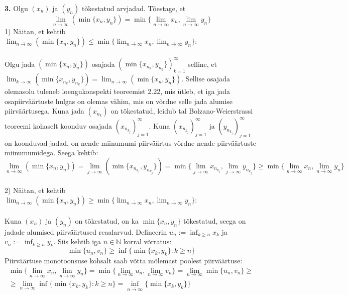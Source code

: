 \documentclass{article}
\begin{document}
\textbf{3.} Olgu $(x_n)$ ja $(y_n)$ t\~okestatud arvjadad. T\~oestage, et
\begin{equation*}
\lim_{\overline{n\to\infty}}(\min \{x_n,y_n\})=\min\{\lim_{\overline{n\to\infty}} x_n, \lim_{\overline{n\to\infty}} y_n \}
\end{equation*}
1) N\"aitan, et kehtib $\displaystyle \lim_{\overline{n\to\infty}}(\min \{x_n,y_n\})\leq\min\{\lim_{\overline{n\to\infty}} x_n, \lim_{\overline{n\to\infty}} y_n \}$:\\\\
Olgu jada $(\min\{x_n,y_n\})$ osajada $(\min\{x_{n_k},y_{n_k}\})_{k=1}^\infty$ selline, et $\displaystyle\lim_{k\to\infty}(\min\{x_{n_k},y_{n_k}\})= \lim_{\overline{n\to\infty}}(\min \{x_n,y_n\})$. Sellise osajada olemasolu tuleneb loengukonspekti teoreemist 2.22, mis \"utleb, et iga jada osapiirv\"a\"artuste hulgas on olemas v\"ahim, mis on v\~ordne selle jada alumise piirv\"a\"artusega. Kuna jada $(x_{n_k})$ on t\~okestatud, leidub  tal Bolzano-Weierstrassi teoreemi kohaselt koonduv osajada $(x_{n_{k_j}})_{j=1}^\infty$. Kuna $(x_{n_{k_j}})_{j=1}^\infty$ ja $(y_{n_{k_j}})_{j=1}^\infty$ on koonduvad jadad, on nende miinumumi piirv\"a\"artus v\~ordne nende piirv\"a\"artuste miinumumidega. Seega kehtib:\\
\begin{equation*}
\lim_{\overline{n\to\infty}}(\min \{x_n,y_n\})=\lim_{{j\to\infty}}(\min \{x_{n_{k_j}},y_{n_{k_j}}\})=\min \{\lim_{{j\to\infty}}x_{n_{k_j}},\lim_{{j\to\infty}}y_{n_{k_j}}\}\geq\min \{\lim_{{\overline{n\to\infty}}}x_n,\lim_{\overline{n\to\infty}}y_n\}
\end{equation*}\\
2) N\"aitan, et kehtib $\displaystyle \lim_{\overline{n\to\infty}}(\min \{x_n,y_n\})\geq\min\{\lim_{\overline{n\to\infty}} x_n, \lim_{\overline{n\to\infty}} y_n \}$:\\\\
Kuna $(x_n)$ ja $(y_n)$ on t\~okestatud, on ka $\min\{x_n,y_n\}$ t\~okestatud, seega on jadade alumised piirv\"a\"artused reaalarvud. Defineerin $u_n:=\displaystyle\inf_{k\geq n} x_k$ ja $v_n:=\displaystyle\inf_{k\geq n} y_k$. Siis kehtib iga $n\in\mathbb{N}$ korral v\~orratus:
\begin{equation*}
\min\{u_n,v_n\}\geq\inf\{\min \{x_k,y_k\}:k\geq n\}
\end{equation*}
Piirv\"a\"artuse monotoonsuse kohsalt saab v\~otta m\~olemast poolest piirv\"a\"artuse:
\begin{gather*}
\min\{\lim_{\overline{n\to\infty}}x_n,\lim_{\overline{n\to\infty}}y_n\}=\min\{\lim_{n\to\infty}u_n,\lim_{n\to\infty}v_n\}=\lim_{n\to\infty}\min\{u_n,v_n\}\geq\\
\geq\lim_{n\to\infty}\inf\{\min \{x_k,y_k\}:k\geq n\}=\inf_{\overline{n\to\infty}}\{\min \{x_k,y_k\}\}
\end{gather*}
\end{document}
